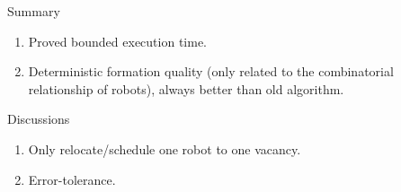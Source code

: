 \begin{frame}{Summary}
  \begin{enumerate}
  \item Proved bounded execution time.
  \item Deterministic formation quality (only related to the combinatorial relationship of robots), always better than old algorithm.
  \end{enumerate}
  Discussions
  \begin{enumerate}
  \item Only relocate/schedule one robot to one vacancy.
  \item Error-tolerance.
  \end{enumerate}
\end{frame}